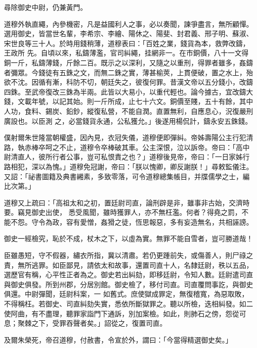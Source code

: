 \begin{pinyinscope}
 尋除御史中尉，仍兼黃門。



 道穆外執直繩，內參機密，凡是益國利人之事，必以奏聞，諫爭盡言，無所顧憚。選用御史，皆當世名輩，李希宗、李繪、陽休之、陽斐、封君義、邢子明、蘇淑、宋世良等三十人。於時用錢稍薄，道穆表曰：「百姓之業，錢貨為本，救弊改鑄，王政所
 先。自頃以來，私鑄薄濫，官司糾繩，挂網非一。在市銅價，八十一文得銅一斤，私鑄薄錢，斤餘二百。既示之以深利，又隨之以重刑，得罪者雖多，姦鑄者彌眾。今錢徒有五銖之文，而無二銖之實，薄甚榆莢，上貫便破，置之水上，殆欲不沈。因循有漸，科防不切，朝廷失之，彼復何罪。昔漢文帝以五分錢小，改鑄四銖。至武帝復改三銖為半兩。此皆以大易小，以重代輕也。論今據古，宜改鑄大錢，文載年號，以記其始。則一斤所成，止七十六文。銅價至賤，五十有餘，其中人功，食料、錫炭、鉛鈔，縱復私營，不能自潤。直置無利，自應息心，況復嚴刑廣設也。以臣測
 之，必當錢貨永通，公私獲允。」後遂用楊侃計，鑄永安五銖錢。



 僕射爾朱世隆當朝權盛，因內見，衣冠失儀，道穆便即彈糾。帝姊壽陽公主行犯清路，執赤棒卒呵之不止，道穆令卒棒破其車。公主深恨，泣以訴帝。帝曰：「高中尉清直人，彼所行者公事，豈可私恨責之也？」道穆後見帝，帝曰：「一日家姊行路相犯，深以為愧。」道穆免冠謝，帝曰：「朕以愧卿，卿反謝朕！」尋敕監儀注。又詔：「祕書圖籍及典書緗素，多致零落，可令道穆總集帳目，并牒儒學之士，編比次第。」



 道穆又上疏曰：「高祖太和之初，置廷尉司直，論刑辟是非，雖事非古始，交濟時要。竊見御史出使，
 悉受風聞，雖時獲罪人，亦不無枉濫。何者？得堯之罰，不能不怨。守令為政，容有愛憎，姦猾之徒，恆思報惡，多有妄造無名，共相誣謗。



 御史一經檢究，恥於不成，杖木之下，以虛為實。無罪不能自雪者，豈可勝道哉！



 臣雖愚短，守不假器，繡衣所指，冀以清肅。若仍更踵前失，或傷善人，則尸祿之責，無所逃罪。如臣鄙見，請依太和故事，還置司直十人，名隸廷尉，秩以五品，選歷官有稱，心平性正者為之。御史若出糾劾，即移廷尉，令知人數。廷尉遣司直與御史俱發。所到州郡，分居別館。御史檢了，移付司直。司直覆問事訖，與御史俱還。中尉彈聞，廷尉科案，一
 如舊式。庶使獄成罪定，無復稽寬，為惡取敗，不得稱枉。若御史、司直糾劾失實，悉依所斷獄罪之。聽以所檢，迭相糾發。如二使阿曲，有不盡理，聽罪家詣門下通訴，別加案檢。如此，則肺石之傍，怨從可息；聚棘之下，受罪吞聲者矣。」詔從之，復置司直。



 及爾朱榮死，帝召道穆，付赦書，令宣於外，謂曰：「今當得精選御史矣。」




\end{pinyinscope}

